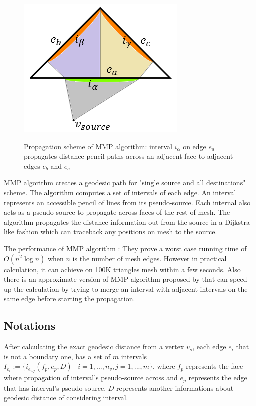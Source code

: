 \documentclass[a4paper,twoside]{article}
\begin{document}
\begin{figure}[!h]
	\centering
	{\includegraphics[width=0.75\columnwidth]{images/mmp_algorithm.png}}
	\caption{Propagation scheme of MMP algorithm: interval $i_{\alpha}$ on edge $e_a$ propagates distance pencil paths across an adjacent face to adjacent edges $e_b$ and $e_c$ }
	\label{fig:mmp algorithm}
\end{figure}

MMP algorithm creates a geodesic path for "single source and all destinations" scheme. The algorithm computes a set of intervals of each edge. An interval represents an accessible pencil of lines from its pseudo-source. Each internal also acts as a pseudo-source to propagate across faces of the rest of mesh. The algorithm propagates the distance information out from the source in a Dijkstra-like fashion which can traceback any positions on mesh to the source.

The performance of MMP algorithm : They prove a worst case
running time of $O(n^2 \log n)$ when $n$ is the number of mesh edges. However in practical calculation, it can achieve on 100K triangles mesh within a few seconds. Also there is an approximate version of MMP algorithm proposed by \cite{Surazhsky:2005:FEA:1073204.1073228} that can speed up the calculation by trying to merge an interval with adjacent intervals on the same edge before starting the propagation.

\subsection*{Notations}
After calculating the exact geodesic distance from a vertex $v_s$, each edge $e_i$ that is not a boundary one, has a set of $m$ intervals $I_{e_i}:=\{ i_{e_{i,j}}(f_p,e_p,D) \mid i = 1, ... ,n_v , j = 1,...,m\}$, where $f_p$ represents the face where propagation of interval's pseudo-source across and $e_p$ represents the edge that has interval's pseudo-source. $D$ represents another informations about geodesic distance of considering interval.
\end{document}
